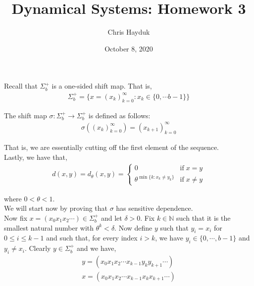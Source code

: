 \documentclass[12pt]{article}
\newenvironment{problem}[2][Problem]{\begin{trivlist}
\item[\hskip \labelsep {\bfseries #1}\hskip \labelsep {\bfseries #2.}]}{\end{trivlist}}
\begin{document}
\title{Dynamical Systems: Homework 3}

\author{Chris Hayduk}
\date{October 8, 2020}

\maketitle

\begin{problem}{1}
\end{problem}

Recall that $\Sigma_b^+$ is a one-sided shift map. That is,
\begin{align*}
\Sigma_b^+ = \{x = (x_k)_{k=0}^{\infty} : x_k \in \{0, \cdots b-1\}\}
\end{align*}

The shift map $\sigma: \Sigma_b^+ \to \Sigma_b^+$ is defined as follows:
\begin{align*}
\sigma((x_k)_{k=0}^{\infty}) = (x_{k+1})_{k = 0}^{\infty}
\end{align*}

That is, we are essentially cutting off the first element of the sequence.\\

Lastly, we have that,
\begin{align*}
d(x, y) = d_{\theta}(x, y) = \begin{cases}
      0 & \text{if} \; x = y \\
      \theta^{\min \{k: x_k \neq y_k\}} & \text{if} \; x \neq y
    \end{cases}
\end{align*}

where $0 < \theta < 1$.\\

We will start now by proving that $\sigma$ has sensitive dependence.\\

Now fix $x = (x_0x_1x_2\cdots) \in \Sigma_b^+$ and let $\delta > 0$. Fix $k \in \mathbb{N}$ such that it is the smallest natural number with $\theta^k < \delta$. Now define $y$ such that $y_i = x_i$ for $0 \leq i \leq k-1$ and such that, for every index $i > k$, we have $y_i \in \{0, \cdots, b-1\}$ and $y_i \neq x_i$. Clearly $y \in \Sigma_b^+$ and we have,
\begin{align*}
y = (x_0x_1x_2\cdots x_{k-1}y_{k}y_{k+1} \cdots)\\
x = (x_0x_1x_2\cdots x_{k-1}x_kx_{k+1} \cdots)
\end{align*}
\end{document}

